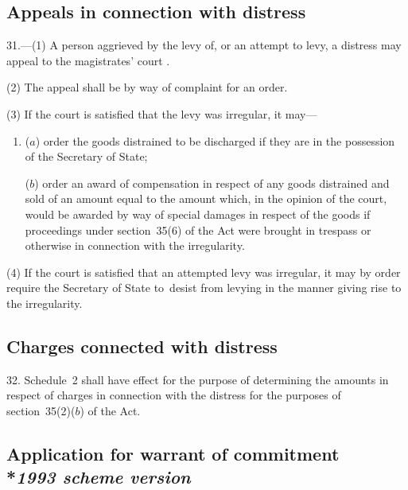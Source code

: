 \documentclass[12pt,a4paper]{article}
\begin{document}
\subsection[31. Appeals in connection with distress]{Appeals in connection with distress}

31.—(1) A person aggrieved by the levy of, or an attempt to levy, a distress may appeal to the magistrates' court%
.

(2) The appeal shall be by way of complaint for an order.

(3) If the court is satisfied that the levy was irregular, it may—
\begin{enumerate}\item[]
($a$) order the goods distrained to be discharged if they are in the possession of the Secretary of State;

($b$) order an award of compensation in respect of any goods distrained and sold of an amount equal to the amount which, in the opinion of the court, would be awarded by way of special damages in respect of the goods if proceedings under section~35(6) of the Act were brought in trespass or otherwise in connection with the irregularity.
\end{enumerate}

(4) If the court is satisfied that an attempted levy was irregular, it may by order require the Secretary of State to~desist from levying in the manner giving rise to the irregularity.


\subsection[32. Charges connected with distress]{Charges connected with distress}

32.  Schedule~2 shall have effect for the purpose of determining the amounts in respect of charges in connection with the distress for the purposes of section~35(2)($b$) of the Act.

\subsection[33. Application for warrant of commitment --- \emph{1993 scheme version}]{Application for warrant of commitment\\*\emph{1993 scheme version}}
\end{document}
